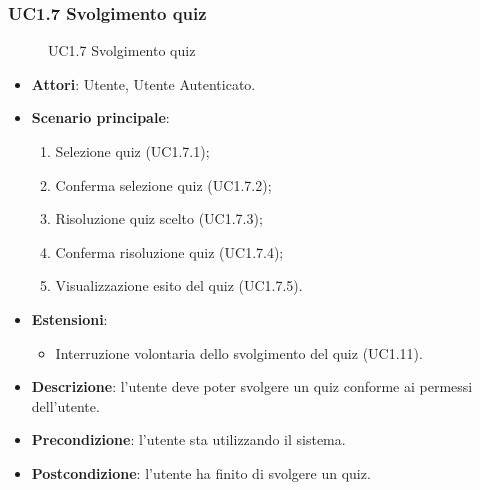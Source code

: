 \subsubsection{UC1.7 Svolgimento quiz}
\begin{figure}[H]
\centering
\noindent{}
\caption{UC1.7 Svolgimento quiz}
\end{figure}
\begin{itemize}
\item \textbf{Attori}: Utente, Utente Autenticato.
\item \textbf{Scenario principale}:
\begin{enumerate}
\item Selezione quiz (UC1.7.1);
\item Conferma selezione quiz (UC1.7.2);
\item Risoluzione quiz scelto (UC1.7.3);
\item Conferma risoluzione quiz (UC1.7.4);
\item Visualizzazione esito del quiz (UC1.7.5).
\end{enumerate}
\item \textbf{Estensioni}:
\begin{itemize}
\item Interruzione volontaria dello svolgimento del quiz (UC1.11).
\end{itemize}
\item \textbf{Descrizione}: l'utente deve poter svolgere un quiz conforme ai permessi dell'utente.
\item \textbf{Precondizione}: l'utente sta utilizzando il sistema.
\item \textbf{Postcondizione}: l'utente ha finito di svolgere un quiz.
\end{itemize}
